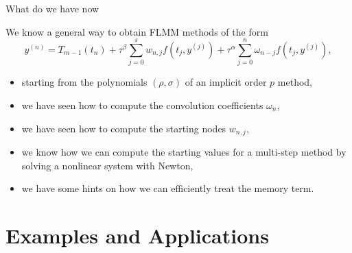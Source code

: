 \documentclass[aspectratio=169,xcolor=dvipsnames]{beamer}
\begin{document}
\begin{frame}{What do we have now}

We know a general way to obtain FLMM methods of the form\vspace{-0.5em}
\[
y^{(n)} = T_{m-1}(t_n) + \tau^\beta \sum_{j=0}^{s} {w_{n,j}} f(t_j,y^{(j)}) + \tau^\alpha \sum_{j=0}^{n} {\omega_{n-j}} f(t_j,y^{(j)}),
\]
\begin{itemize}
	\item[\textcolor{success}{\faCheckCircle}] starting from the polynomials $(\rho,\sigma)$ of an implicit order $p$ method,
	\item[\textcolor{success}{\faCheckCircle}] we have seen how to compute the convolution coefficients $\omega_n$,
	\item[\textcolor{success}{\faCheckCircle}] we have seen how to compute the starting nodes $w_{n,j}$,
	\item[\textcolor{success}{\faCheckCircle}] we know how we can compute the starting values for a multi-step method by solving a nonlinear system with Newton,
	\item[\textcolor{success}{\faCheckCircle}] we have some hints on how we can efficiently treat the memory term.
\end{itemize}


\end{frame}

\section{Examples and Applications}
\end{document}
